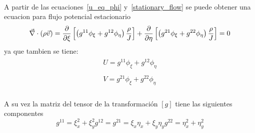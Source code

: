 \documentclass[letterpaper, openright, 12pt]{book}
\begin{document}
    \paragraph*{}
        A partir de las ecuaciones~\ref{u_eq_phi} y~\ref{stationary_flow} se
        puede obtener una ecuacion para flujo potencial estacionario
        \begin{equation}
            \vec{\nabla} \cdot \left( \rho \vec{v} \right)
                    = \pdv{\xi} \left[ \left(g^{11}\phi_{\xi}
                            + g^{12} \phi_{\eta} \right) \frac{\rho}{J} \right]
                        + \pdv{\eta} \left[ \left(g^{21} \phi_{\xi}
                            + g^{22} \phi_{\eta} \right) \frac{\rho}{J} \right]
                    = 0
        \end{equation}
        ya que tambien se tiene:
        \begin{align}
            \begin{aligned}
            U = g^{11} \phi_{\xi} + g^{12} \phi_{\eta}
            \label{eq_potencial_1}
            \end{aligned}
            \\
            \begin{aligned}
            V = g^{21} \phi_{\xi} + g^{22} \phi_{\eta}
            \label{eq_potencial_2}
            \end{aligned}
        \end{align}

    \paragraph*{}
        A su vez la matriz del tensor de la transformación $[g]$ tiene las
        siguientes componentes
        \begin{subequations}
            \begin{equation}
                g^{11} = \xi_{x}^{2} + \xi_{y}^2
            \end{equation}
            \begin{equation}
                    g^{12} = g^{21} = \xi_{x} \eta_{x} + \xi_{y} \eta_{y}
            \end{equation}
            \begin{equation}
                g^{22} = \eta_{x}^{2} + \eta_{y}^2
            \end{equation}
        \end{subequations}
\end{document}
